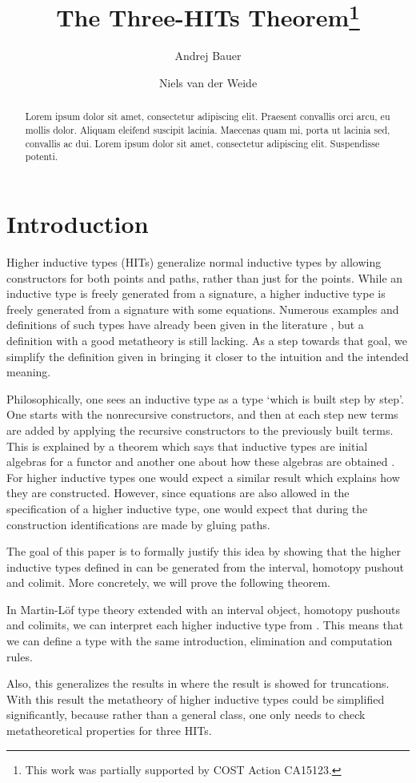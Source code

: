 \documentclass[a4paper,UKenglish]{lipics-v2016}
\title{The Three-HITs Theorem\footnote{This work was partially supported by COST Action CA15123.}}
\author[1]{Andrej Bauer}
\author[2]{Niels van der Weide}
\affil[1]{Department of Mathematics and Physics, University of Ljubljana, Ljubljana, Slovenia\\
  \texttt{Andrej.Bauer@andrej.com}}
\affil[2]{Department of Computer Science, Radboud University, Nijmegen, The Netherlands\\
  \texttt{nweide@cs.ru.nl}}
\begin{document}
\maketitle

\begin{abstract}
Lorem ipsum dolor sit amet, consectetur adipiscing elit. Praesent convallis orci arcu, eu mollis dolor. Aliquam eleifend suscipit lacinia. Maecenas quam mi, porta ut lacinia sed, convallis ac dui. Lorem ipsum dolor sit amet, consectetur adipiscing elit. Suspendisse potenti. 
 \end{abstract}

\section{Introduction}
Higher inductive types (HITs) generalize normal inductive types by allowing constructors for both points and paths, rather than just for the points.
While an inductive type is freely generated from a signature, a higher inductive type is freely generated from a signature with some equations.
Numerous examples and definitions of such types have already been given in the literature \cite{altenkirch2016quotient,awodey2012inductive,basoldhigher,sojakova2015higher,hottbook}, but a definition with a good metatheory is still lacking.
As a step towards that goal, we simplify the definition given in \cite{basoldhigher} bringing it closer to the intuition and the intended meaning.

Philosophically, one sees an inductive type as a type `which is built step by step'.
One starts with the nonrecursive constructors, and then at each step new terms are added by applying the recursive constructors to the previously built terms.
This is explained by a theorem which says that inductive types are initial algebras for a functor \cite{dybjer1994inductive,dybjer2003induction} and another one about how these algebras are obtained \cite{adamek1974free}.
For higher inductive types one would expect a similar result which explains how they are constructed.
However, since equations are also allowed in the specification of a higher inductive type, one would expect that during the construction identifications are made by gluing paths.

The goal of this paper is to formally justify this idea by showing that the higher inductive types defined in \cite{basoldhigher} can be generated from the interval, homotopy pushout and colimit.
More concretely, we will prove the following theorem.
\begin{theorem}
\label{thm:three-hit}
In Martin-L\"of type theory extended with an interval object, homotopy pushouts and colimits, we can interpret each higher inductive type from \cite{basoldhigher}. This means that we can define a type with the same introduction, elimination and computation rules.
\end{theorem}
Also, this generalizes the results in \cite{doorn2016constructing,kraus2014general,kraus2016constructions} where the result is showed for truncations.
With this result the metatheory of higher inductive types could be simplified significantly, because rather than a general class, one only needs to check metatheoretical properties for three HITs.
\end{document}
